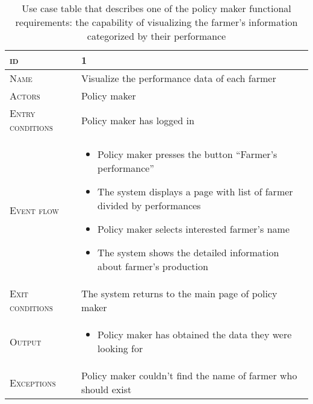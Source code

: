 \begin{table}[H]
    \centering
    \begin{tabular}{|l|p{}|}
        \hline %
    	\textsc{id}                 &   1\\
    	\hline %
    	\textsc{Name}               &   Visualize the performance data of each farmer\\
    	\hline %
    	\textsc{Actors}             &   Policy maker\\
    	\hline %
    	\textsc{Entry conditions}   &   Policy maker has logged in\\
    	\hline %
    	\textsc{Event flow}         &   \footnotesize
            	                        \begin{itemize}
                                    	    \item Policy maker presses the button “Farmer’s performance”
                                    		\item The system displays a page with list of farmer divided by performances
                                    		\item Policy maker selects interested farmer’s name
                                    		\item The system shows the detailed information about farmer’s production
                                        \end{itemize}\\
        \hline %
        \textsc{Exit conditions}    &  The system returns to the main page of policy maker\\
    	\hline %
    	\textsc{Output}             &  \begin{itemize}
    	    \item Policy maker has obtained the data they were looking for
    	\end{itemize}\\
    	\hline %
    	\textsc{Exceptions}         &  Policy maker couldn’t find the name of farmer who should exist\\
    	\hline %
        
    \end{tabular}
    \caption{\label{tab:visualize_farmer_performance}Use case table that describes one of the policy maker functional requirements:  the capability of visualizing the farmer's information categorized by their performance} %
\end{table}


